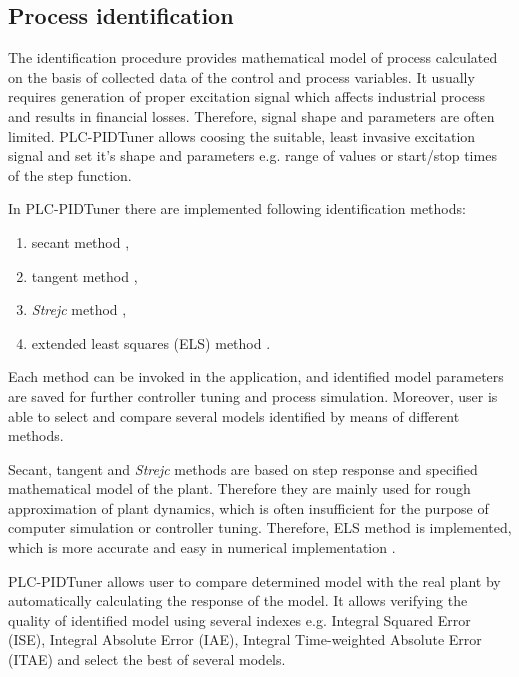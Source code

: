 \documentclass{amcs}
\begin{document}
\subsection{Process identification}
%
The identification procedure provides mathematical model of process calculated on the basis of collected data of the control and process variables. It usually requires generation of proper excitation signal which affects industrial process and results in financial losses. Therefore, signal shape and parameters are often limited. PLC-PIDTuner allows coosing the suitable, least invasive excitation signal and set it's shape and parameters e.g. range of values or start/stop times of the step function.

In PLC-PIDTuner there are implemented following identification methods:
\begin{enumerate}
	\item secant method \cite{Haber:1999},
	\item tangent method \cite{Haber:1999},
	\item \textit{Strejc} method \cite{Strejc:1959},
	\item extended least squares (ELS) method  \cite{Mozaryn:2016}.
\end{enumerate}

Each method can be invoked in the application, and identified model parameters are saved for further controller tuning and process simulation. Moreover, user is able to select and compare several models identified by means of different methods. 

Secant, tangent and \textit{Strejc} methods are based on step response and specified mathematical model of the plant. Therefore they are mainly used for rough approximation of plant dynamics, which is often insufficient for the purpose of computer simulation or controller tuning. Therefore, ELS method is implemented, which is more accurate and easy in numerical implementation \cite{Mozaryn:2016}. 

PLC-PIDTuner allows user to compare determined model with the real plant by automatically calculating the response of the model. It allows verifying the quality of identified model using several indexes e.g. Integral Squared Error (ISE),  Integral Absolute Error (IAE), Integral Time-weighted Absolute Error (ITAE) and select the best of several models.
\end{document}
